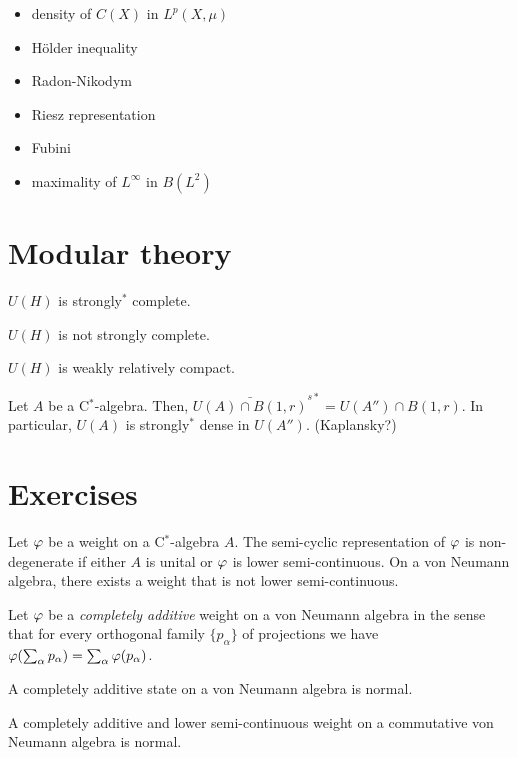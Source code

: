 \documentclass{../../large}
\begin{document}
\begin{itemize}
\item density of $C(X)$ in $L^p(X,\mu)$
\item H\"older inequality
\item Radon-Nikodym
\item Riesz representation
\item Fubini
\item maximality of $L^\infty$ in $B(L^2)$
\end{itemize}




\section{Modular theory}


\begin{prb}
\begin{parts}
\item $U(H)$ is strongly$^*$ complete.
\item $U(H)$ is not strongly complete.
\item $U(H)$ is weakly relatively compact.
\end{parts}
\end{prb}


Let $A$ be a C$^*$-algebra.
Then, $\bar{U(A)\cap B(1,r)}^{s*}=U(A'')\cap B(1,r)$.
In particular, $U(A)$ is strongly$^*$ dense in $U(A'')$.
(Kaplansky?)





\section*{Exercises}
\begin{prb}
Let $\varphi$ be a weight on a C$^*$-algebra $A$.
The semi-cyclic representation of $\varphi$ is non-degenerate if either $A$ is unital or $\varphi$ is lower semi-continuous.
On a von Neumann algebra, there exists a weight that is not lower semi-continuous.
\end{prb}

\begin{prb}
Let $\varphi$ be a \emph{completely additive} weight on a von Neumann algebra in the sense that for every orthogonal family $\{p_\alpha\}$ of projections we have $\varphi(\sum_\alpha p_\alpha)=\sum_\alpha\varphi(p_\alpha)$.
\begin{parts}
\item A completely additive state on a von Neumann algebra is normal.
\item A completely additive and lower semi-continuous weight on a commutative von Neumann algebra is normal.
\end{parts}
\end{prb}
\end{document}
